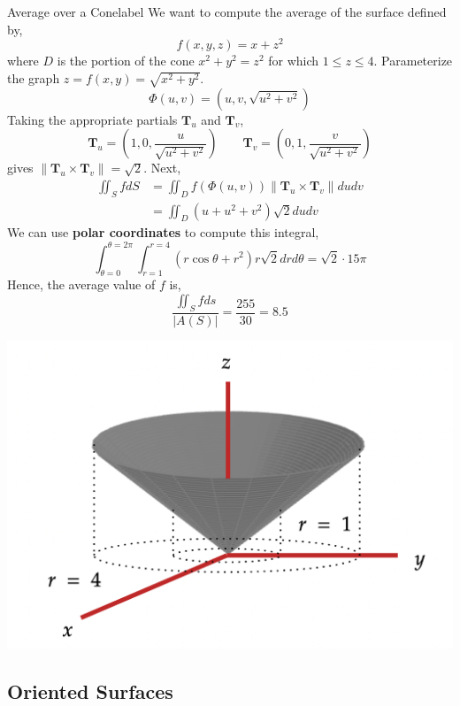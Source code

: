 \begin{ex}{Average over a Cone}{label}
	We want to compute the average of the surface defined by,
	\[f(x, y, z) = x + z^2\]
	where $D$ is the portion of the cone $x^2 + y^2 = z^2$ for which $1 \leq z \leq 4$. Parameterize the graph $z = f(x, y) = \sqrt{x^2 + y^2}$.
	\[\Phi(u, v)=\left(u, v, \sqrt{u^2+v^2}\right)\]
	Taking the appropriate partials $\mathbf{T}_u$ and $\mathbf{T}_v$,
	\[\mathbf{T}_u = \left(1, 0, \frac{u}{\sqrt{u^2+v^2}}\right) \quad \quad \mathbf{T}_v = \left(0, 1, \frac{v}{\sqrt{u^2+v^2}}\right)\]
	gives $\|\mathbf{T}_u \times \mathbf{T}_v\| = \sqrt{2}$. Next,
	\begin{align*}
		\iint_S f d S & =\iint_D f(\Phi(u, v))\left\|\mathbf{T}_u \times \mathbf{T}_v\right\| d u d v \\
		& =\iint_D\left(u+u^2+v^2\right) \sqrt{2} d u d v
	 \end{align*} 
	 We can use \textbf{polar coordinates} to compute this integral,
	 \[\int_{\theta=0}^{\theta=2 \pi} \int_{r=1}^{r=4}\left(r \cos \theta+r^2\right) r \sqrt{2} d r d \theta = \sqrt{2} \cdot 15 \pi\]
	 Hence, the average value of $f$ is,
	 \[\frac{\iint_S f ds}{|A(S)|} = \frac{255}{30} = 8.5\]
\end{ex}

\begin{marginfigure}
	\begin{center}
	\includegraphics[width=\linewidth]{figures/wk-6/fig-18.png}
	\end{center}
\end{marginfigure}

\subsection{Oriented Surfaces}

